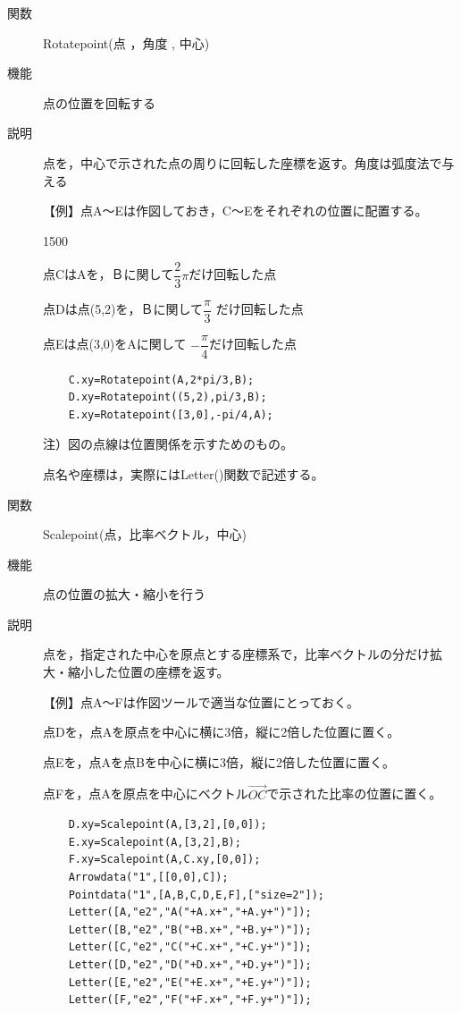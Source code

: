 \documentclass[papersize,a4paper,12pt,uplatex]{jsarticle}
\begin{document}
\begin{description}
\vspace{\baselineskip}
\hypertarget{rotatepoint}{}
\item[関数]  Rotatepoint(点 ，角度 , 中心)
\item[機能]  点の位置を回転する
\item[説明]  点を，中心で示された点の周りに回転した座標を返す。角度は弧度法で与える

\vspace{\baselineskip}
【例】点A〜Eは作図しておき，C〜Eをそれぞれの位置に配置する。

\begin{layer}{150}{0}
\end{layer}
\begin{spacing}{1.5}
点CはAを，Ｂに関して$\dfrac{2}{3}\pi $だけ回転した点
    
点Dは点(5,2)を，Ｂに関して$\dfrac{\pi}{3}$ だけ回転した点
\end{spacing}
点Eは点(3,0)をAに関して $-\dfrac{\pi}{4} $だけ回転した点

\begin{verbatim}
    C.xy=Rotatepoint(A,2*pi/3,B);
    D.xy=Rotatepoint((5,2),pi/3,B);
    E.xy=Rotatepoint([3,0],-pi/4,A);
\end{verbatim}
注）図の点線は位置関係を示すためのもの。

点名や座標は，実際にはLetter()関数で記述する。

\vspace{\baselineskip}
\hypertarget{scalepoint}{}
\item[関数]  Scalepoint(点，比率ベクトル，中心)
\item[機能]  点の位置の拡大・縮小を行う
\item[説明]  点を，指定された中心を原点とする座標系で，比率ベクトルの分だけ拡大・縮小した位置の座標を返す。

\vspace{\baselineskip}
【例】点A〜Fは作図ツールで適当な位置にとっておく。

点Dを，点Aを原点を中心に横に3倍，縦に2倍した位置に置く。

点Eを，点Aを点Bを中心に横に3倍，縦に2倍した位置に置く。

点Fを，点Aを原点を中心にベクトル$\overrightarrow{OC} $で示された比率の位置に置く。
\begin{verbatim}
    D.xy=Scalepoint(A,[3,2],[0,0]);
    E.xy=Scalepoint(A,[3,2],B);
    F.xy=Scalepoint(A,C.xy,[0,0]);
    Arrowdata("1",[[0,0],C]);
    Pointdata("1",[A,B,C,D,E,F],["size=2"]);
    Letter([A,"e2","A("+A.x+","+A.y+")"]);
    Letter([B,"e2","B("+B.x+","+B.y+")"]);
    Letter([C,"e2","C("+C.x+","+C.y+")"]);
    Letter([D,"e2","D("+D.x+","+D.y+")"]);
    Letter([E,"e2","E("+E.x+","+E.y+")"]);
    Letter([F,"e2","F("+F.x+","+F.y+")"]);
\end{verbatim}
\vspace{\baselineskip}
          \begin{center}  \end{center}


\end{description}
\end{document}

